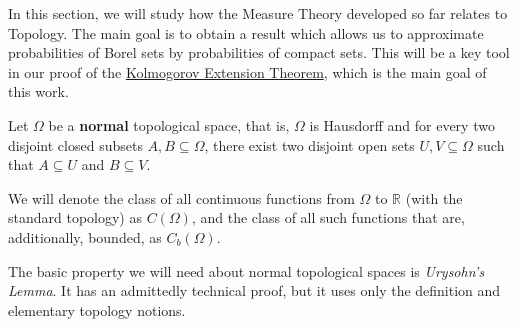In this section, we will study how the Measure Theory developed so far relates to Topology. The main goal is to obtain a result which allows us to approximate probabilities of Borel sets by probabilities of compact sets. This will be a key tool in our proof of the \hyperref[theorem:Kolmogorov Extension]{Kolmogorov Extension Theorem}, which is the main goal of this work.
\begin{defn}
		Let \(\Omega\) be a \textbf{normal} topological space, that is, \(\Omega\) is Hausdorff and for every two disjoint closed subsets \(A, B\subseteq\Omega\), there exist two disjoint open sets \(U, V\subseteq\Omega\) such that \(A\subseteq U\) and \(B\subseteq V\).

		We will denote the class of all continuous functions from \(\Omega\) to \(\mathbb{R}\) (with the standard topology) as \(C(\Omega)\), and the class of all such functions that are, additionally, bounded, as \(C_b(\Omega)\).
\end{defn}

The basic property we will need about normal topological spaces is \emph{Urysohn's Lemma}. It has an admittedly technical proof, but it uses only the definition and elementary topology notions.

